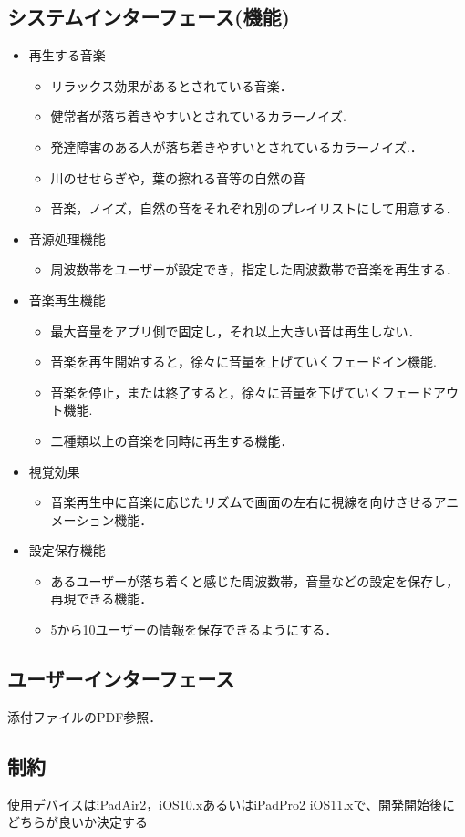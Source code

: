 \documentclass{jarticle}
\begin{document}
\subsection{システムインターフェース(機能)}
\begin{itemize}
  \item 再生する音楽
    \begin{itemize}
      \item リラックス効果があるとされている音楽．
      \item 健常者が落ち着きやすいとされているカラーノイズ.
      \item 発達障害のある人が落ち着きやすいとされているカラーノイズ.．
      \item 川のせせらぎや，葉の擦れる音等の自然の音
      \item 音楽，ノイズ，自然の音をそれぞれ別のプレイリストにして用意する．
    \end{itemize}
  \item 音源処理機能
    \begin{itemize}
      \item 周波数帯をユーザーが設定でき，指定した周波数帯で音楽を再生する．
    \end{itemize}
   \item 音楽再生機能
    \begin{itemize}
      \item 最大音量をアプリ側で固定し，それ以上大きい音は再生しない．
      \item 音楽を再生開始すると，徐々に音量を上げていくフェードイン機能.
      \item 音楽を停止，または終了すると，徐々に音量を下げていくフェードアウト機能.
      \item 二種類以上の音楽を同時に再生する機能．
    \end{itemize}
  \item 視覚効果
    \begin{itemize}
      \item 音楽再生中に音楽に応じたリズムで画面の左右に視線を向けさせるアニメーション機能．
    \end{itemize}
  \item 設定保存機能
    \begin{itemize}
      \item あるユーザーが落ち着くと感じた周波数帯，音量などの設定を保存し，再現できる機能． 
      \item 5から10ユーザーの情報を保存できるようにする．
    \end{itemize}
\end{itemize}
\subsection{ユーザーインターフェース}
添付ファイルのPDF参照．
\subsection{制約}
使用デバイスはiPadAir2，iOS10.xあるいはiPadPro2 iOS11.xで、開発開始後にどちらが良いか決定する
\end{document}
